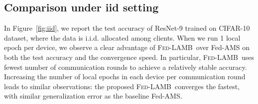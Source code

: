 \documentclass[11pt]{article}
\newcommand{\algo}{\textsc{Fed-LAMB}}
\begin{document}
\subsection{Comparison under iid setting}

In Figure~\ref{fig:iid}, we report the test accuracy of ResNet-9 trained on CIFAR-10 dataset, where the data is i.i.d. allocated among clients.
When we run 1 local epoch per device, we observe a clear advantage of \algo\ over Fed-AMS on both the test accuracy and the convergence speed. In particular, \algo\ uses fewest number of communication rounds to achieve a relatively stable accuracy. Increasing the number of local epochs in each device per communication round leads to similar observations: the proposed \algo\ converges the fastest, with similar generalization error as the baseline Fed-AMS. 
\end{document}
